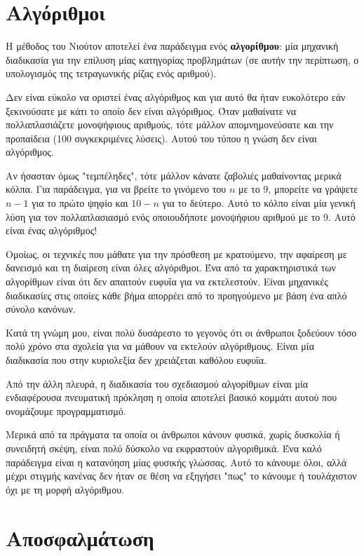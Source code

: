 \documentclass[10pt]{book}
\begin{document}
\section{Αλγόριθμοι}

Η μέθοδος του Νιούτον αποτελεί ένα παράδειγμα ενός {\bf αλγορίθμου}: 
μία μηχανική διαδικασία για την επίλυση μίας κατηγορίας προβλημάτων
(σε αυτήν την περίπτωση, ο υπολογισμός της τετραγωνικής ρίζας ενός αριθμού).

Δεν είναι εύκολο να οριστεί ένας αλγόριθμος και για αυτό θα ήταν ευκολότερο εάν ξεκινούσατε με κάτι το οποίο δεν είναι αλγόριθμος. Όταν μαθαίνατε να πολλαπλασιάζετε μονοψήφιους αριθμούς, τότε μάλλον απομνημονεύσατε και την προπαίδεια (100 συγκεκριμένες λύσεις). Αυτού του τύπου η γνώση δεν είναι αλγόριθμος.

Αν ήσασταν όμως "τεμπέληδες", τότε μάλλον κάνατε ζαβολιές μαθαίνοντας μερικά κόλπα. Για παράδειγμα, για να βρείτε το γινόμενο του $n$ με το 9, μπορείτε να γράψετε $n-1$ για το πρώτο ψηφίο και $10-n$ για το δεύτερο. Αυτό το κόλπο είναι μία γενική λύση για τον πολλαπλασιασμό ενός οποιουδήποτε μονοψήφιου αριθμού με το 9. Αυτό είναι ένας αλγόριθμος!

Ομοίως, οι τεχνικές που μάθατε για την πρόσθεση με κρατούμενο, την αφαίρεση με
δανεισμό και τη διαίρεση είναι όλες αλγόριθμοι. Ένα από τα χαρακτηριστικά των
αλγορίθμων είναι ότι δεν απαιτούν ευφυΐα για να εκτελεστούν. Είναι μηχανικές διαδικασίες στις οποίες κάθε βήμα απορρέει από το προηγούμενο με βάση ένα απλό σύνολο κανόνων.

Κατά τη γνώμη μου, είναι πολύ δυσάρεστο το γεγονός ότι οι άνθρωποι ξοδεύουν τόσο πολύ χρόνο στα σχολεία για να μάθουν να εκτελούν αλγόριθμους. Είναι μία διαδικασία που στην κυριολεξία δεν χρειάζεται καθόλου ευφυΐα.

Από την άλλη πλευρά, η διαδικασία του σχεδιασμού αλγορίθμων είναι μία ενδιαφέρουσα πνευματική πρόκληση η οποία αποτελεί βασικό κομμάτι αυτού που ονομάζουμε προγραμματισμό.

Μερικά από τα πράγματα τα οποία οι άνθρωποι κάνουν φυσικά, χωρίς δυσκολία ή συνειδητή σκέψη, είναι πολύ δύσκολο να εκφραστούν αλγοριθμικά. Ένα καλό παράδειγμα είναι η κατανόηση μίας φυσικής γλώσσας. Αυτό το κάνουμε όλοι, αλλά μέχρι στιγμής κανένας δεν ήταν σε θέση να εξηγήσει "πως" το κάνουμε ή τουλάχιστον όχι με τη μορφή αλγόριθμου.


\section{Αποσφαλμάτωση}
\end{document}
